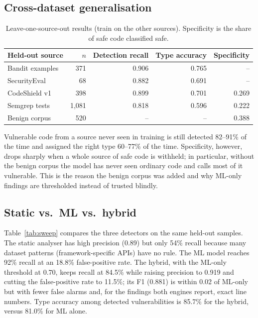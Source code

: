 \documentclass[11pt,a4paper,twoside]{report}
\begin{document}
\subsection{Cross-dataset generalisation}
\begin{table}[H]
\centering\small
\begin{tabular}{lrrrr}
\toprule
Held-out source & $n$ & Detection recall & Type accuracy & Specificity\\
\midrule
Bandit examples & 371 & 0.906 & 0.765 & --\\
SecurityEval & 68 & 0.882 & 0.691 & --\\
CodeShield v1 & 398 & 0.899 & 0.701 & 0.269\\
Semgrep tests & 1{,}081 & 0.818 & 0.596 & 0.222\\
Benign corpus & 520 & -- & -- & 0.388\\
\bottomrule
\end{tabular}
\caption{Leave-one-source-out results (train on the other sources). Specificity is the share of safe code classified safe.}
\end{table}
Vulnerable code from a source never seen in training is still detected 82--91\% of the time and assigned the right type 60--77\% of the time. Specificity, however, drops sharply when a whole source of safe code is withheld; in particular, without the benign corpus the model has never seen ordinary code and calls most of it vulnerable. This is the reason the benign corpus was added and why ML-only findings are thresholded instead of trusted blindly.

\subsection{Static vs.\ ML vs.\ hybrid}
Table~\ref{tab:sweep} compares the three detectors on the same held-out samples. The static analyser has high precision (0.89) but only 54\% recall because many dataset patterns (framework-specific APIs) have no rule. The ML model reaches 92\% recall at an 18.8\% false-positive rate. The hybrid, with the ML-only threshold at 0.70, keeps recall at 84.5\% while raising precision to 0.919 and cutting the false-positive rate to 11.5\%; its F1 (0.881) is within 0.02 of ML-only but with fewer false alarms and, for the findings both engines report, exact line numbers. Type accuracy among detected vulnerabilities is 85.7\% for the hybrid, versus 81.0\% for ML alone.
\end{document}
